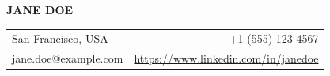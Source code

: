 \documentclass[9pt, letterpaper]{extarticle}
\makeatletter
\newcommand{\resumeName}{Jane Doe}
\newcommand{\resumeLocation}{San Francisco, USA}
\newcommand{\resumeEmail}{jane.doe@example.com}
\newcommand{\resumePhone}{+1 (555) 123-4567}
\newcommand{\resumeLinkedIn}{https://www.linkedin.com/in/janedoe}
\makeatother
\begin{document}
\pagestyle{empty}

\begin{center}
  {\Large\textbf{\MakeUppercase{\resumeName}}}
\end{center}
\vspace{-8pt}
\begin{tabularx}{\textwidth}{@{}X r@{}}
  {\small\resumeLocation} & {\small\resumePhone}                            \\
  {\small\resumeEmail}    & {\small\href{\resumeLinkedIn}{\resumeLinkedIn}}
\end{tabularx}
\vspace{4pt}


\end{document}
